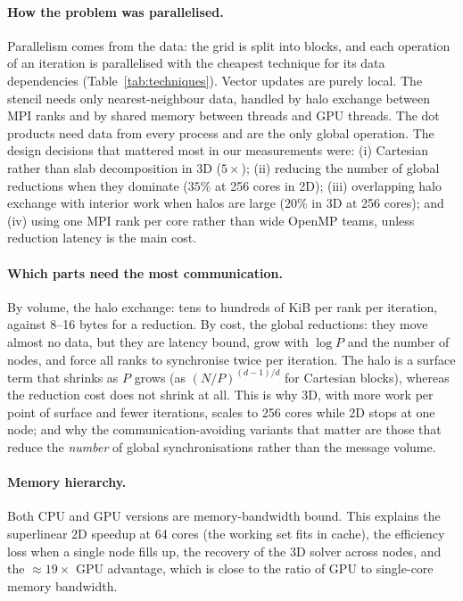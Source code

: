 \documentclass[11pt,a4paper]{article}
\begin{document}
\paragraph{How the problem was parallelised.} Parallelism comes from the data: the grid is
split into blocks, and each operation of an iteration is parallelised with the cheapest technique
for its data dependencies (Table~\ref{tab:techniques}). Vector updates are purely local. The
stencil needs only nearest-neighbour data, handled by halo exchange between MPI ranks and by
shared memory between threads and GPU threads. The dot products need data from every process and
are the only global operation. The design decisions that mattered most in our measurements were:
(i) Cartesian rather than slab decomposition in 3D ($5\times$); (ii) reducing the number of global
reductions when they dominate ($35\%$ at 256 cores in 2D); (iii) overlapping halo exchange with
interior work when halos are large ($20\%$ in 3D at 256 cores); and (iv) using one MPI rank per
core rather than wide OpenMP teams, unless reduction latency is the main cost.

\paragraph{Which parts need the most communication.} By volume, the halo exchange: tens to
hundreds of KiB per rank per iteration, against 8--16 bytes for a reduction. By cost, the global
reductions: they move almost no data, but they are latency bound, grow with $\log P$ and the
number of nodes, and force all ranks to synchronise twice per iteration. The halo is a surface
term that shrinks as $P$ grows (as $(N/P)^{(d-1)/d}$ for Cartesian blocks), whereas the reduction
cost does not shrink at all. This is why 3D, with more work per point of surface and fewer
iterations, scales to 256 cores while 2D stops at one node; and why the communication-avoiding
variants that matter are those that reduce the \emph{number} of global synchronisations rather
than the message volume.

\paragraph{Memory hierarchy.} Both CPU and GPU versions are memory-bandwidth bound. This explains
the superlinear 2D speedup at 64 cores (the working set fits in cache), the efficiency loss when a
single node fills up, the recovery of the 3D solver across nodes, and the $\approx19\times$ GPU
advantage, which is close to the ratio of GPU to single-core memory bandwidth.
\end{document}
